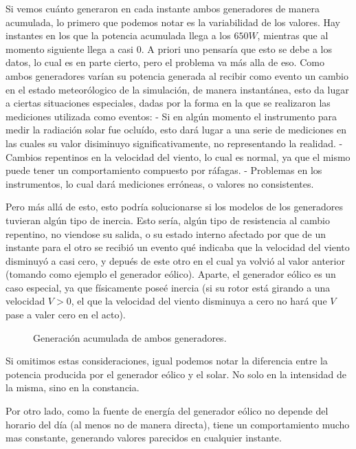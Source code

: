     Si vemos cuánto generaron en cada instante ambos generadores de manera
acumulada, lo primero que podemos notar es la variabilidad de los
valores. Hay instantes en los que la potencia acumulada llega a los
\(650W\), mientras que al momento siguiente llega a casi 0. A priori uno
pensaría que esto se debe a los datos, lo cual es en parte cierto, pero
el problema va más alla de eso. Como ambos generadores varían su
potencia generada al recibir como evento un cambio en el estado
meteorólogico de la simulación, de manera instantánea, esto da lugar a
ciertas situaciones especiales, dadas por la forma en la que se
realizaron las mediciones utilizada como eventos: - Si en algún momento
el instrumento para medir la radiación solar fue ocluído, esto dará
lugar a una serie de mediciones en las cuales su valor disiminuyo
significativamente, no representando la realidad. - Cambios repentinos
en la velocidad del viento, lo cual es normal, ya que el mismo puede
tener un comportamiento compuesto por ráfagas. - Problemas en los
instrumentos, lo cual dará mediciones erróneas, o valores no
consistentes.

Pero más allá de esto, esto podría solucionarse si los modelos de los
generadores tuvieran algún tipo de inercia. Esto sería, algún tipo de
resistencia al cambio repentino, no viendose su salida, o su estado
interno afectado por que de un instante para el otro se recibió un
evento qué indicaba que la velocidad del viento disminuyó a casi cero, y
depués de este otro en el cual ya volvió al valor anterior (tomando como
ejemplo el generador eólico). Aparte, el generador eólico es un caso
especial, ya que físicamente poseé inercia (si su rotor está girando a
una velocidad \(V > 0\), el que la velocidad del viento disminuya a cero
no hará que \(V\) pase a valer cero en el acto).

\begin{figure}[H]
    \begin{center}
    \end{center}
    \caption{Generación acumulada de ambos generadores.}
\end{figure}

    Si omitimos estas consideraciones, igual podemos notar la diferencia
entre la potencia producida por el generador eólico y el solar. No solo
en la intensidad de la misma, sino en la constancia.

Por otro lado, como la fuente de energía del generador eólico no depende
del horario del día (al menos no de manera directa), tiene un
comportamiento mucho mas constante, generando valores parecidos en
cualquier instante.

